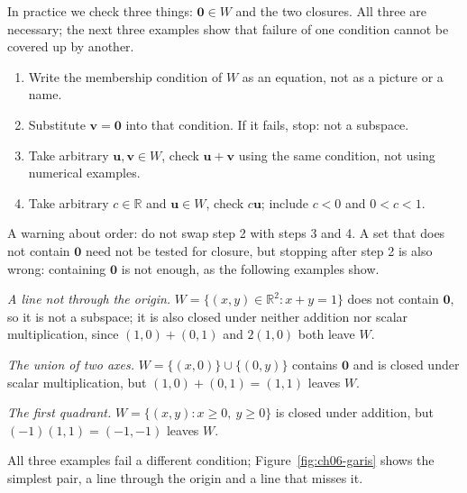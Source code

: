 In practice we check three things: $\mathbf{0}\in W$ and the two closures. All three are
necessary; the next three examples show that failure of one condition cannot be covered up by
another.
\begin{resep}
\begin{enumerate}
  \item Write the membership condition of $W$ as an equation, not as a picture or a name.
  \item Substitute $\mathbf{v}=\mathbf{0}$ into that condition. If it fails, stop: not a subspace.
  \item Take arbitrary $\mathbf{u},\mathbf{v}\in W$, check $\mathbf{u}+\mathbf{v}$ using the same
        condition, not using numerical examples.
  \item Take arbitrary $c\in\mathbb{R}$ and $\mathbf{u}\in W$, check $c\mathbf{u}$; include
        $c<0$ and $0<c<1$.
\end{enumerate}
A warning about order: do not swap step 2 with steps 3 and 4. A set that does not contain
$\mathbf{0}$ need not be tested for closure, but stopping after step 2 is also wrong: containing
$\mathbf{0}$ is not enough, as the following examples show.
\end{resep}


\emph{A line not through the origin.} $W=\{(x,y)\in\mathbb{R}^{2}:x+y=1\}$ does not contain
$\mathbf{0}$, so it is not a subspace; it is also closed under neither addition nor scalar
multiplication, since $(1,0)+(0,1)$ and $2(1,0)$ both leave $W$.

\emph{The union of two axes.} $W=\{(x,0)\}\cup\{(0,y)\}$ contains $\mathbf{0}$ and is closed
under scalar multiplication, but $(1,0)+(0,1)=(1,1)$ leaves $W$.

\emph{The first quadrant.} $W=\{(x,y):x\ge 0,\ y\ge 0\}$ is closed under addition, but
$(-1)(1,1)=(-1,-1)$ leaves $W$.

All three examples fail a different condition; Figure~\ref{fig:ch06-garis} shows the simplest
pair, a line through the origin and a line that misses it.

